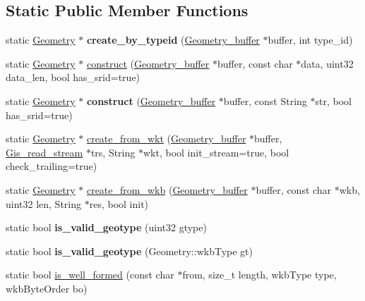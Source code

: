 \subsection*{Static Public Member Functions}
\begin{DoxyCompactItemize}
\item 
\mbox{\label{classGeometry_a35112436d873212cfdb614b7c25f8c3a}} 
static \mbox{\hyperlink{classGeometry}{Geometry}} $\ast$ {\bfseries create\+\_\+by\+\_\+typeid} (\mbox{\hyperlink{structGeometry__buffer}{Geometry\+\_\+buffer}} $\ast$buffer, int type\+\_\+id)
\item 
static \mbox{\hyperlink{classGeometry}{Geometry}} $\ast$ \mbox{\hyperlink{classGeometry_af9294b8724cd69b7e1e52b84bbccc034}{construct}} (\mbox{\hyperlink{structGeometry__buffer}{Geometry\+\_\+buffer}} $\ast$buffer, const char $\ast$data, uint32 data\+\_\+len, bool has\+\_\+srid=true)
\item 
\mbox{\label{classGeometry_ab077d70c78ab6b4f23fbea9814ba4082}} 
static \mbox{\hyperlink{classGeometry}{Geometry}} $\ast$ {\bfseries construct} (\mbox{\hyperlink{structGeometry__buffer}{Geometry\+\_\+buffer}} $\ast$buffer, const String $\ast$str, bool has\+\_\+srid=true)
\item 
static \mbox{\hyperlink{classGeometry}{Geometry}} $\ast$ \mbox{\hyperlink{classGeometry_a71d6852fd0285a9bffaca556592cae39}{create\+\_\+from\+\_\+wkt}} (\mbox{\hyperlink{structGeometry__buffer}{Geometry\+\_\+buffer}} $\ast$buffer, \mbox{\hyperlink{classGis__read__stream}{Gis\+\_\+read\+\_\+stream}} $\ast$trs, String $\ast$wkt, bool init\+\_\+stream=true, bool check\+\_\+trailing=true)
\item 
static \mbox{\hyperlink{classGeometry}{Geometry}} $\ast$ \mbox{\hyperlink{classGeometry_a4da1f81e54738cbad61df5931ed997c5}{create\+\_\+from\+\_\+wkb}} (\mbox{\hyperlink{structGeometry__buffer}{Geometry\+\_\+buffer}} $\ast$buffer, const char $\ast$wkb, uint32 len, String $\ast$res, bool init)
\item 
\mbox{\label{classGeometry_a2a662813e6871bcf72836f51abf06bc7}} 
static bool {\bfseries is\+\_\+valid\+\_\+geotype} (uint32 gtype)
\item 
\mbox{\label{classGeometry_a67e78566eb6c0fabd794c27de7813af0}} 
static bool {\bfseries is\+\_\+valid\+\_\+geotype} (Geometry\+::wkb\+Type gt)
\item 
static bool \mbox{\hyperlink{classGeometry_ae034f775d692619cc4bc8842d34a4cd8}{is\+\_\+well\+\_\+formed}} (const char $\ast$from, size\+\_\+t length, wkb\+Type type, wkb\+Byte\+Order bo)
\end{DoxyCompactItemize}
